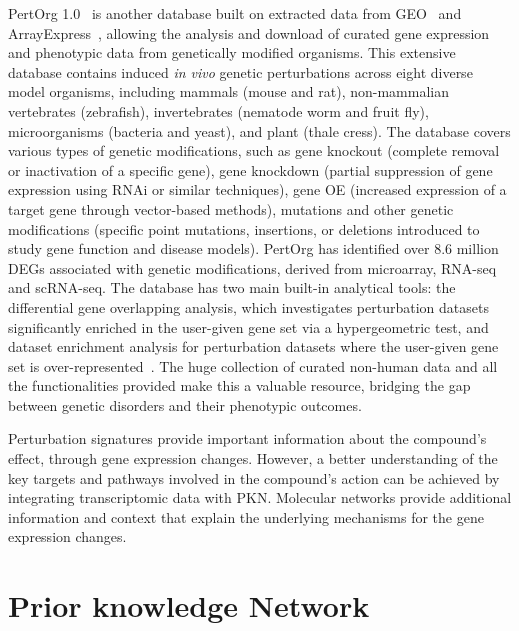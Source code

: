 PertOrg 1.0~\cite{RN85} is another database built on extracted data from \gls{GEO}~\cite{RN98} and ArrayExpress~\cite{RN122}, allowing the analysis and download of curated gene expression and phenotypic data from genetically modified organisms. 
This extensive database contains induced \textit{in vivo} genetic perturbations across eight diverse model organisms, including mammals (mouse and rat), non-mammalian vertebrates (zebrafish), invertebrates (nematode worm and fruit fly), microorganisms (bacteria and yeast), and plant (thale cress). The database covers various types of genetic modifications, such as gene knockout (complete removal or inactivation of a specific gene), gene knockdown (partial suppression of gene expression using \gls{RNA}i or similar techniques), gene \gls{OE} (increased expression of a target gene through vector-based methods), mutations and other genetic modifications (specific point mutations, insertions, or deletions introduced to study gene function and disease models). 
PertOrg has identified over 8.6 million \gls{DEGs} associated with genetic modifications, derived from microarray, \gls{RNA-seq} and \gls{scRNA-seq}. 
The database has two main built-in analytical tools: the differential gene overlapping analysis, which investigates perturbation datasets significantly enriched in the user-given gene set via a hypergeometric test, and dataset enrichment analysis for perturbation datasets where the user-given gene set is over-represented~\cite{RN85}. 
The huge collection of curated non-human data and all the functionalities provided make this a valuable resource, bridging the gap between genetic disorders and their phenotypic outcomes.

Perturbation signatures provide important information about the compound's effect, through gene expression changes. However, a better understanding of the key targets and pathways involved in the compound's action can be achieved by integrating transcriptomic data with \gls{PKN}. \gls{Molecular network}s provide additional information and context that explain the underlying mechanisms for the gene expression changes.

\section{Prior knowledge Network} %
\label{sec:PriorknowledgeNetwork}

